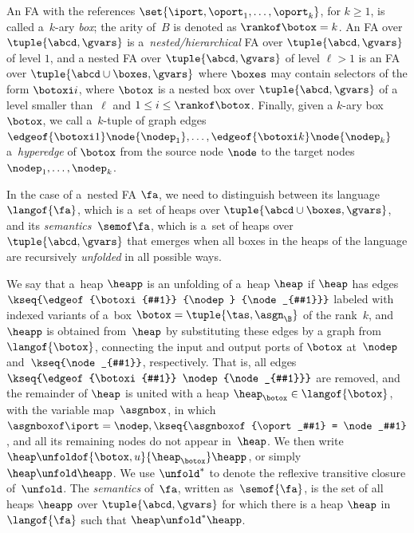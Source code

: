 An FA with the references $\set{\iport,\oport_1,\ldots,\oport_k}$, for $k \geq 1$, is called a~$k$-ary \emph{box}; 
the arity of~$B$ is denoted as $\rankof\botox = k$.
%
An FA over $\tuple{\abcd, \gvars}$ is a~\emph{nested/hierarchical} FA over $\tuple{\abcd, \gvars}$ of level $1$,
%
and a nested FA over $\tuple{\abcd, \gvars}$ of level $\ell>1$ 
is an FA over $\tuple{\abcd\cup\boxes, \gvars}$ where $\boxes$ may contain
selectors of the form $\botoxi i$, where $\botox$ is a nested box over
$\tuple{\abcd, \gvars}$ of a level smaller than~$\ell$ and $1\leq i \leq \rankof\botox$. 
%
Finally, given a $k$-ary box $\botox$, we call a~$k$-tuple of graph edges $\edgeof {\botoxi 1} \node {\nodep_1},\ldots,\edgeof {\botoxi k} \node {\nodep_k}$  a~\emph{hyperedge} of $\botox$ from the source node $\node$ to the target nodes 
$\nodep_1,\ldots,\nodep_k$.
%

In the case of a~nested FA $\fa$, we need to distinguish between its
language~$\langof{\fa}$, which is a~set of heaps over $\tuple{\abcd \cup \boxes,
\gvars}$, and its \emph{semantics}~$\semof \fa$, which is a~set of heaps over
$\tuple{\abcd, \gvars}$ that emerges when all boxes in the heaps of the
language are recursively \emph{unfolded} in all possible ways.
%


We say that a~heap $\heapp$ is an unfolding of a~heap $\heap$
if $\heap$ has edges 
$\kseq{\edgeof{\botoxi{#1}} {\nodep} {\node_{#1}}}$
labeled with indexed variants of a~box 
$\botox = \tuple{\tas, \asgn_\B}$ of the rank~$k$, 
and~$\heapp$ is obtained from~$\heap$ by substituting these edges by a graph
from $\langof{\botox}$, connecting the input and output ports of $\botox$
at~$\nodep$ and~$\kseq{\node_{#1}}$, 
respectively. 
That is, all edges 
$\kseq{\edgeof {\botoxi{#1}} \nodep {\node_{#1}}}$ 
are removed, 
and the remainder of $\heap$ is united with a heap $\heap_\botox\in
\langof{\botox}$, with the variable map~$\asgnbox$,
in which
$\asgnboxof \iport = \nodep,\kseq{\asgnboxof {\oport_#1} = \node_#1}$, 
and all its remaining nodes do not appear in~$\heap$.
We then write $\heap \unfoldof{\botox,u}{\heap_{\botox}} \heapp$, 
or simply $\heap\unfold\heapp$. 
We use $\unfold^{*}$ to denote the reflexive transitive
closure of~$\unfold$.
The \emph{semantics} of~$\fa$, written as~$\semof{\fa}$,
is the set of all heaps $\heapp$ over $\tuple{\abcd, \gvars}$ for which
there is a heap $\heap$ in~$\langof{\fa}$ such that $\heap \unfold^{*}
\heapp$.




